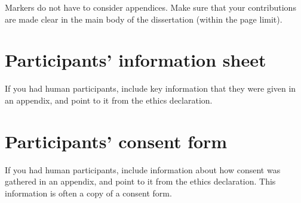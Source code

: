 \documentclass[logo,bsc,singlespacing,parskip]{infthesis}
\theoremstyle{definition}
\begin{document}
Markers do not have to consider appendices. Make sure that your contributions
are made clear in the main body of the dissertation (within the page limit).

\chapter{Participants' information sheet}

If you had human participants, include key information that they were given in
an appendix, and point to it from the ethics declaration.

\chapter{Participants' consent form}

If you had human participants, include information about how consent was
gathered in an appendix, and point to it from the ethics declaration.
This information is often a copy of a consent form.
\end{document}

